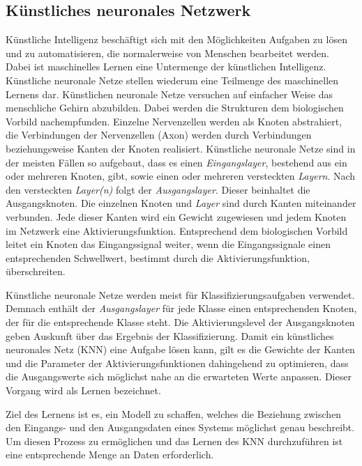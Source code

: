 \documentclass[11pt]{article}
\begin{document}
\subsection{Künstliches neuronales Netzwerk}

Künstliche Intelligenz beschäftigt sich mit den Möglichkeiten Aufgaben zu lösen und zu automatisieren, die normalerweise von Menschen bearbeitet werden. Dabei ist maschinelles Lernen eine Untermenge der künstlichen Intelligenz. Künstliche neuronale Netze stellen wiederum eine Teilmenge des maschinellen Lernens dar. Künstlichen neuronale Netze versuchen auf einfacher Weise das menschliche Gehirn abzubilden. Dabei werden die Strukturen dem biologischen Vorbild nachempfunden. Einzelne Nervenzellen werden als Knoten abstrahiert, die Verbindungen der Nervenzellen (Axon) werden durch Verbindungen beziehungsweise Kanten der Knoten realisiert. Künstliche neuronale Netze sind in der meisten Fällen so aufgebaut, dass es einen \textit{Eingangslayer}, bestehend aus ein oder mehreren Knoten, gibt, sowie einen oder mehreren versteckten \textit{Layern}. Nach den versteckten \textit{Layer(n)} folgt der \textit{Ausgangslayer}. Dieser beinhaltet die Ausgangsknoten. Die einzelnen Knoten und \textit{Layer} sind durch Kanten miteinander verbunden. Jede dieser Kanten wird ein Gewicht zugewiesen und jedem Knoten im Netzwerk eine Aktivierungsfunktion. Entsprechend dem biologischen Vorbild leitet ein Knoten das Eingangssignal weiter, wenn die Eingangssignale einen entsprechenden Schwellwert, bestimmt durch die Aktivierungsfunktion, überschreiten.

Künstliche neuronale Netze werden meist für Klassifizierungsaufgaben verwendet. Demnach enthält der \textit{Ausgangslayer} für jede Klasse einen entsprechenden Knoten, der für die entsprechende Klasse steht. Die Aktivierungslevel der Ausgangsknoten geben Auskunft über das Ergebnis der Klassifizierung.  Damit ein künstliches neuronales Netz (KNN) eine Aufgabe lösen kann, gilt es die Gewichte der Kanten und die Parameter der Aktivierungsfunktionen dahingehend zu optimieren, dass die Ausgangswerte sich möglichst nahe an die erwarteten Werte anpassen. Dieser Vorgang wird als Lernen bezeichnet.

Ziel des Lernens ist es, ein Modell zu schaffen, welches die Beziehung zwischen den Eingangs- und den Ausgangsdaten eines Systems möglichst genau beschreibt. Um diesen Prozess zu ermöglichen und das Lernen des KNN durchzuführen ist eine entsprechende Menge an Daten erforderlich.\parencite{M.AnderssonM.Arvola}\parencite{Chollet2017}
\end{document}
